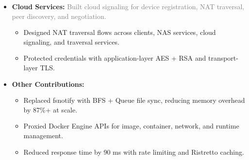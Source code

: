 \documentclass{resume}
\begin{document}
\begin{itemize}
     \item \textbf{Cloud Services:}
    {\small
    \noindent\textcolor{gray}{Built cloud signaling for device registration, NAT traversal, peer discovery, and negotiation.}
    }
    \vspace{0.2ex}
    \begin{itemize}
        \item Designed NAT traversal flows across clients, NAS services, cloud signaling, and traversal services.
        \item Protected credentials with application-layer AES + RSA and transport-layer TLS.
    \end{itemize}
    \vspace{1ex}

    \item \textbf{Other Contributions:}
    \begin{itemize}
        \item Replaced fsnotify with BFS + Queue file sync, reducing memory overhead by 87\%+ at scale.
        \item Proxied Docker Engine APIs for image, container, network, and runtime management.
        \item Reduced response time by 90 ms with rate limiting and Ristretto caching.
    \end{itemize}

\end{itemize}
\end{document}
